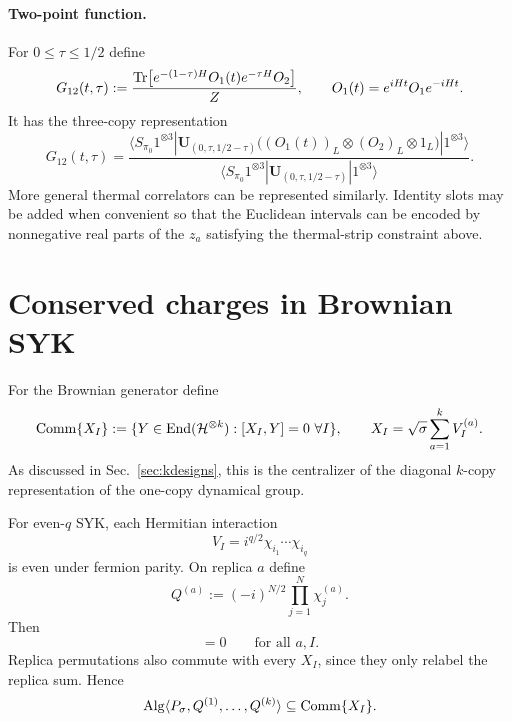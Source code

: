 \documentclass{article}
\theoremstyle{definition}
\begin{document}
\paragraph{Two-point function.}
For $0\le\tau\le1/2$ define
\begin{equation}
    G_{12}(t,\tau)
    :=\frac{
      {\rm Tr}\!\left[
        e^{-(1-\tau)H}O_1(t)e^{-\tau H}O_2
      \right]
    }{Z},
    \qquad
    O_1(t)=e^{iHt}O_1e^{-iHt}.
\end{equation}
It has the three-copy representation
\begin{equation}
    G_{12}(t,\tau)
    =\frac{
      \langle S_{\pi_0}1^{\otimes3}|
      \mathbf U_{(0,\tau,1/2-\tau)}
      \bigl((O_1(t))_L\otimes(O_2)_L\otimes1_L\bigr)
      |1^{\otimes3}\rangle
    }{
      \langle S_{\pi_0}1^{\otimes3}|
      \mathbf U_{(0,\tau,1/2-\tau)}
      |1^{\otimes3}\rangle
    }.
\end{equation}
More general thermal correlators can be represented similarly.  Identity
slots may be added when convenient so that the Euclidean intervals can be
encoded by nonnegative real parts of the $z_a$ satisfying the thermal-strip
constraint above.

\section{Conserved charges in Brownian SYK}

For the Brownian generator define
\begin{equation}
    {\rm Comm}\{X_I\}
    :=\{Y\in{\rm End}({\cal H}^{\otimes k}):[X_I,Y]=0\ \forall I\},
    \qquad
    X_I=\sqrt\sigma\sum_{a=1}^kV_I^{(a)}.
\end{equation}
As discussed in Sec.~\ref{sec:kdesigns}, this is the centralizer of the diagonal $k$-copy
representation of the one-copy dynamical group.

For even-$q$ SYK, each Hermitian interaction
\begin{equation}
    V_I=i^{q/2}\chi_{i_1}\cdots\chi_{i_q}
\end{equation}
is even under fermion parity.  On replica $a$ define
\begin{equation}
    Q^{(a)}
    :=(-i)^{N/2}\prod_{j=1}^N\chi_j^{(a)}.
\end{equation}
Then
\begin{equation}
    [Q^{(a)},X_I]=0
    \qquad\text{for all }a,I.
\end{equation}
Replica permutations also commute with every $X_I$, since they only relabel
the replica sum.  Hence
\begin{equation}
    {\rm Alg}\langle
       P_\sigma,Q^{(1)},\ldots,Q^{(k)}
    \rangle
    \subseteq {\rm Comm}\{X_I\}.
\end{equation}
\end{document}

